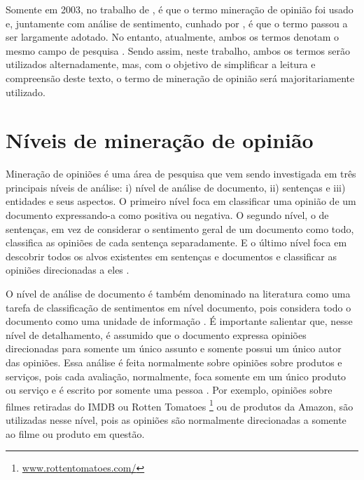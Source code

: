 \documentclass[template.tex]{subfiles}
\begin{document}
Somente em 2003, no trabalho de , é que o termo mineração de opinião foi usado e, juntamente com análise de sentimento, cunhado por , é que o termo passou a ser largamente adotado. No entanto, atualmente, ambos os termos denotam o mesmo campo de pesquisa \cite{bing:2012, pang:2008}. Sendo assim, neste trabalho, ambos os termos serão utilizados alternadamente, mas, com o objetivo de simplificar a leitura e compreensão deste texto, o termo de mineração de opinião será majoritariamente utilizado.

\section{Níveis de mineração de opinião}


Mineração de opiniões é uma área de pesquisa que vem sendo investigada em três principais níveis de análise: i) nível de análise de documento, ii) sentenças e iii) entidades e seus aspectos. O primeiro nível foca em classificar uma opinião de um documento expressando-a como positiva ou negativa. O segundo nível, o de sentenças, em vez de considerar o sentimento geral de um documento como todo, classifica as opiniões de cada sentença separadamente. E o último nível foca em descobrir todos os alvos existentes em sentenças e documentos e classificar as opiniões direcionadas a eles \cite{bing:2012}.

O nível de análise de documento é também denominado na literatura como uma tarefa de classificação de sentimentos em nível documento, pois considera todo o documento como uma unidade de informação \cite{bing:2012, pang:2008}. É importante salientar que, nesse nível de detalhamento, é assumido que o documento expressa opiniões direcionadas para somente um único assunto e somente possui um único autor das opiniões. Essa análise é feita normalmente sobre opiniões sobre produtos e serviços, pois cada avaliação, normalmente, foca somente em um único produto ou serviço e é escrito por somente uma pessoa \cite{bing:2012}. Por exemplo, opiniões sobre filmes retiradas do IMDB ou Rotten Tomatoes \footnote{\url{www.rottentomatoes.com/}} ou de produtos da Amazon, são utilizadas nesse nível, pois as opiniões são normalmente direcionadas a somente ao filme ou produto em questão. 
\end{document}
